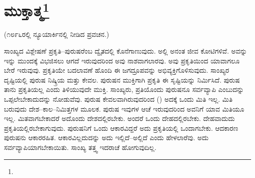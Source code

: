 
\chapter[ಮುಕ್ತಾತ್ಮ]{ಮುಕ್ತಾತ್ಮ\protect\footnote{}}

\begin{center}
(೧೮೯೬ರಲ್ಲಿ ನ್ಯೂಯಾರ್ಕಿನಲ್ಲಿ ನೀಡಿದ ಪ್ರವಚನ.)
\end{center}

ಸಾಂಖ್ಯದ ವಿಶ್ಲೇಷಣೆ ಪ್ರಕೃತಿ–ಪುರುಷರೆಂಬ ದ್ವೈತದಲ್ಲಿ ಕೊನೆಗಾಣುವುದು. ಅಲ್ಲಿ ಅನಂತ ಜೀವ ಕೋಟಿಗಳಿವೆ. ಅವನ್ನು ಇನ್ನು ಮುಂದಕ್ಕೆ ವಿಭಜಿಸಲು ಆಗದೆ ಇರುವುದರಿಂದ ಅವು ನಾಶವಾಗಲಾರವು. ಅವು ಪ್ರಕೃತಿಯಿಂದ ಯಾವಾಗಲೂ ಬೇರೆ ಇರುವುವು. ಪ್ರಕೃತಿಯೇ ಬದಲಾವಣೆ ಹೊಂದಿ ಈ ಜಗದ್ರೂಪವನ್ನು ಅಭಿವ್ಯಕ್ತಿಗೊಳಿಸುವುದು. ಸಾಂಖ್ಯರ ದೃಷ್ಟಿಯಲ್ಲಿ ಪುರುಷ ನಿಷ್ಕ್ರಿಯ ಮತ್ತು ಕೇವಲ. ಪುರುಷನ ಮುಕ್ತಿಗಾಗಿ ಪ್ರಕೃತಿ ಈ ಸೃಷ್ಟಿಯನ್ನು ನಿರ್ಮಿಸಿದೆ. ಪುರುಷ ತಾನು ಪ್ರಕೃತಿಯಲ್ಲ ಎಂದು ತಿಳಿಯುವುದೇ ಮುಕ್ತಿ. ಸಾಂಖ್ಯರು, ಪ್ರತಿಯೊಂದು ಪುರುಷನೂ ಸರ್ವವ್ಯಾಪಿ ಎಂಬುದನ್ನು ಒಪ್ಪಲೇಬೇಕಾದುದನ್ನು ನೋಡುವೆವು. ಪುರುಷ ಕೇವಲವಾಗಿರುವುದರಿಂದ () ಅದಕ್ಕೆ ಒಂದು ಮಿತಿ ಇಲ್ಲ. ಮಿತಿ ಬರುವುದು ದೇಶ–ಕಾಲ–ನಿಮಿತ್ತಗಳ ಮೂಲಕ. ಪುರುಷ ಇವುಗಳ ಆಚೆ ಇರುವುದರಿಂದ ಅವನಿಗೆ ಯಾವ ಮಿತಿಯೂ ಇಲ್ಲ. ಮಿತವಾಗಬೇಕಾದರೆ ಅದೊಂದು ದೇಶದಲ್ಲಿರಬೇಕು. ಅಂದರೆ ಒಂದು ದೇಹದಲ್ಲಿರಬೇಕು. ದೇಹವಾದುದು ಪ್ರಕೃತಿಯಲ್ಲಿರಬೇಕಾಗುವುದು. ಪುರುಷನಿಗೆ ಒಂದು ಆಕಾರವಿದ್ದರೆ ಅದು ಪ್ರಕೃತಿಯಲ್ಲಿ ಒಂದಾಗಬೇಕು. ಆದಕಾರಣ ಪುರುಷನು ಆಕಾರರಹಿತ. ಆಕಾರವಿಲ್ಲದುದನ್ನು ಅದು ಇಲ್ಲಿದೆ–ಅಲ್ಲಿದೆ ಎಂದು ಹೇಳಲಾರೆವು. ಅದು ಸರ್ವವ್ಯಾಪಿಯಾಗಬೇಕಾಯಿತು. ಸಾಂಖ್ಯ ತತ್ತ್ವ ಇದರಾಚೆ ಹೋಗುವುದಿಲ್ಲ.

